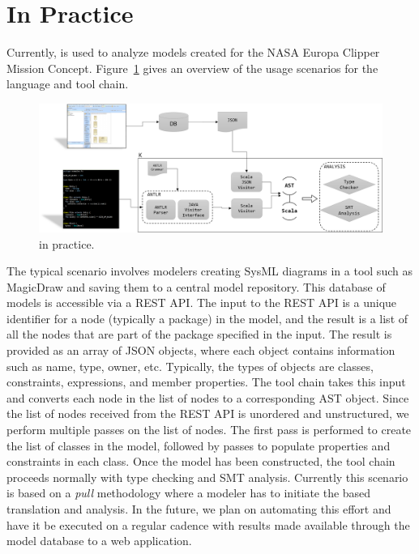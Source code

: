 \section{\Klang{} In Practice}
\label{sec:usage}

Currently, \Klang{} is used to analyze models created for the NASA
Europa Clipper Mission Concept. Figure~\ref{fig:k} gives an overview
of the usage scenarios for the \Klang{} language and tool chain.

\begin{figure}
\centering
\includegraphics[scale=0.39]{K.png}
\caption{\Klang{} in practice.}
\label{fig:k}
\end{figure}

The typical scenario involves modelers creating SysML diagrams in a
tool such as MagicDraw and saving them to a central model
repository. This database of models is accessible via a REST API. The
input to the REST API is a unique identifier for a node (typically a
\sysml{} package) in the model, and the result is a list of all the
nodes that are part of the package specified in the input. The result
is provided as an array of JSON objects, where each object contains
information such as name, type, owner, etc. Typically, the types of
objects are classes, constraints, expressions, and member
properties. The \Klang{} tool chain takes this input and converts each
node in the list of nodes to a corresponding \Klang{} AST
object. Since the list of nodes received from the REST API is
unordered and unstructured, we perform multiple passes on
the list of nodes. The first pass is performed to create the list of
classes in the model, followed by passes to populate properties and
constraints in each class. Once the \Klang{} model has been
constructed, the \Klang{} tool chain proceeds normally with type
checking and SMT analysis. Currently this scenario is based on a {\em
  pull} methodology where a modeler has to initiate the \Klang{} based
translation and analysis. In the future, we plan on automating this
effort and have it be executed on a regular cadence with results made
available through the model database to a web application.

